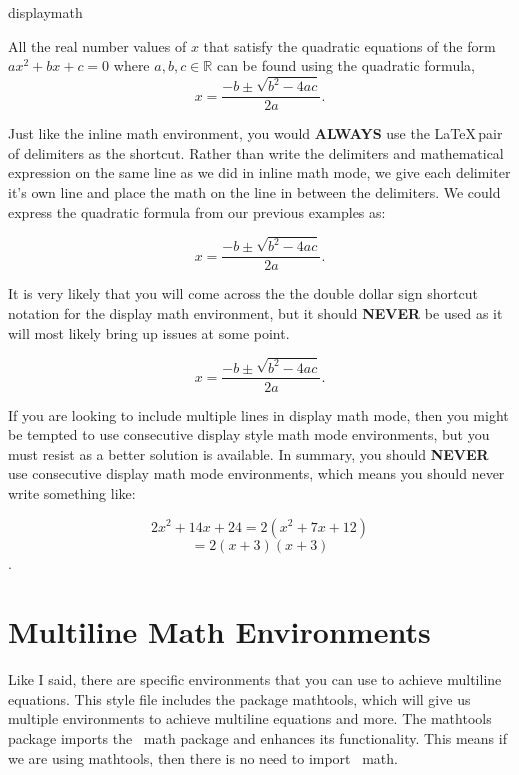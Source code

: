 \begin{docEnvironment*}[doclang/environment content=mathematics content goes here]{displaymath}{}{}
\begin{dispExample}
All the real number values of \( x \) that satisfy the quadratic equations
of the form \( ax^2 + bx + c = 0 \) where \( a, b, c \in \mathbb{R} \) 
can be found using the quadratic formula,
\begin{displaymath}
  x = \frac{-b \pm \sqrt{b^2 - 4ac}}{2a}.
\end{displaymath}
\end{dispExample}
Just like the inline math environment, you would \textbf{ALWAYS} use the 
\LaTeX\,pair of \cs{[}  \cs{]} delimiters as the 
shortcut. Rather than write the delimiters and mathematical expression on the same 
line as we did in inline math mode, we give each delimiter it's own line 
and place the math on the line in between the delimiters. We could express the
quadratic formula from our previous examples as:
\begin{dispExample}
\[
  x = \frac{-b \pm \sqrt{b^2 - 4ac}}{2a}.
\]
\end{dispExample}
It is very likely that you will come across the the double dollar sign 
shortcut notation for the display math environment, but it should 
\textbf{NEVER} be used as it will most likely bring up issues at some point. 
\begin{dispExample}
$$
  x = \frac{-b \pm \sqrt{b^2 - 4ac}}{2a}.
$$
\end{dispExample} 
If you are looking to include multiple lines in display math mode, then
you might be tempted to use consecutive display style math mode 
environments, but you must resist as a better solution is available.
In summary, you should \textbf{NEVER} use consecutive display math mode 
environments, which means you should never write something like:
\begin{dispExample}
  \[ 
    2x^2 + 14x + 24 = 2( x^2 + 7x + 12 )
  \]
  \[ 
    = 2(x + 3)(x + 3) 
  \].
\end{dispExample}
\end{docEnvironment*}

\section{Multiline Math Environments}

Like I said, there are specific environments that you can use to achieve multiline 
equations. This style file includes the package mathtools, which will give us 
multiple environments to achieve multiline equations and more.  The mathtools package
imports the \AmS\ math package and enhances its functionality.  This means if we are
using mathtools, then there is no need to import \AmS\ math.

